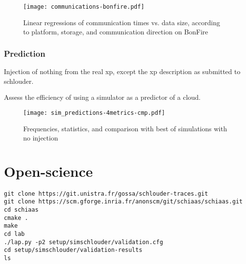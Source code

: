 \documentclass[a4paper,10pt]{article}
\newcommand\vrpath{../../lab/setup/simschlouder/validation-results/}
\begin{document}
\begin{figure}
  \centering
  \texttt{[image: communications-bonfire.pdf]}
  
  \caption{Linear regressions of communication times vs. data size, 
    according to platform, storage, and communication direction on BonFire}
\end{figure} 


\subsubsection{Prediction}

Injection of nothing from the real xp, except the xp description as submitted 
to schlouder.

Assess the efficiency of using a simulator as a predictor of a cloud.

\begin{figure}
  \centering
  \texttt{[image: sim\_predictions-4metrics-cmp.pdf]}
  
  

  

  

  
  \caption{Frequencies, statistics, and comparison with best of simulations with no injection}
\end{figure} 

\section{Open-science}

\begin{verbatim}
git clone https://git.unistra.fr/gossa/schlouder-traces.git
git clone https://scm.gforge.inria.fr/anonscm/git/schiaas/schiaas.git 
cd schiaas
cmake .
make
cd lab
./lap.py -p2 setup/simschlouder/validation.cfg
cd setup/simschlouder/validation-results
ls
\end{verbatim}





\end{document}
